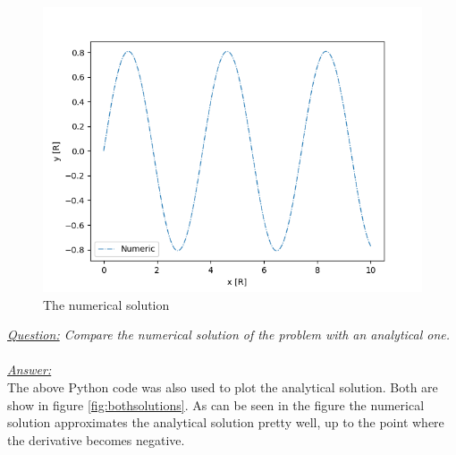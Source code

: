\documentclass{article}
\begin{document}
\begin{figure}[h!]
	\centering
	\includegraphics[width=0.55\linewidth,keepaspectratio]{afbeeldingen/numerical_solution.png}
	\caption{The numerical solution}
	\label{fig:numersolut}
\end{figure}
\textit{\underline{Question:} Compare the numerical solution of the problem with an analytical one.}\\
\\
\textit{\underline{Answer:}} \\
The above Python code was also used to plot the analytical solution. Both are show in figure \ref{fig:bothsolutions}. As can be seen in the figure the numerical solution approximates the analytical solution pretty well, up to the point where the derivative becomes negative.\\
\end{document}
